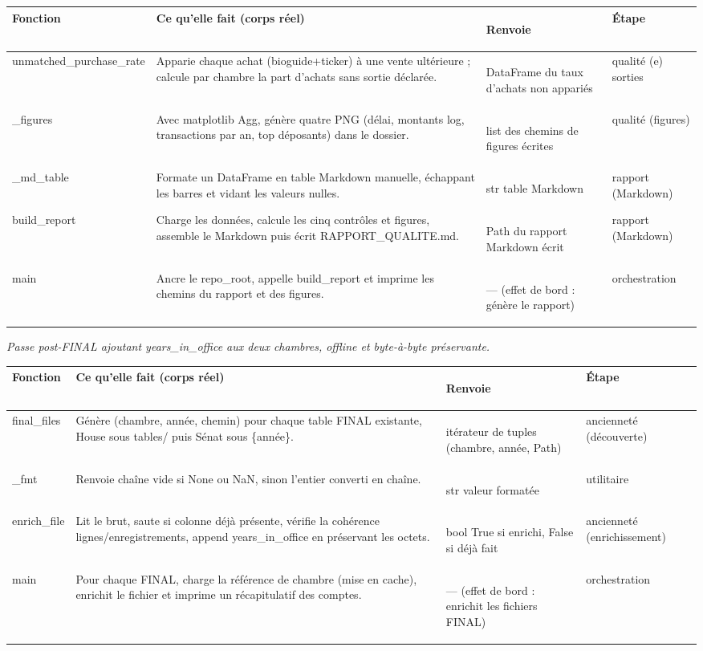 \documentclass[11pt,a4paper]{article}
\makeatletter
\newenvironment{fnt}{%
  \par\footnotesize
  \setlength{\tabcolsep}{3pt}%
  \begin{longtable}{@{}>{\ttfamily\scriptsize\raggedright\arraybackslash}p{3.0cm} >{\raggedright\arraybackslash}p{7.5cm} >{\itshape\scriptsize\raggedright\arraybackslash}p{2.7cm} >{\scriptsize\raggedright\arraybackslash}p{1.85cm}@{}}
  \toprule
  \normalfont\bfseries\scriptsize Fonction & \bfseries\scriptsize Ce qu'elle fait (corps réel) &
  \normalfont\bfseries\scriptsize Renvoie & \normalfont\bfseries\scriptsize Étape\\
  \midrule\endhead
}{\bottomrule\end{longtable}\par}
\newcommand{\fnmod}[2]{\par\smallskip\noindent{\ttfamily\bfseries #1}\;\textmd{\itshape\small\textemdash{} #2}\par\nobreak\vspace{2pt}}
\makeatother
\begin{document}
\begin{fnt}
unmatched_\allowbreak purchase_\allowbreak rate & Apparie chaque achat (bioguide+ticker)\allowbreak{} à une vente ultérieure ; calcule par chambre la part d'achats sans sortie déclarée. & DataFrame du taux d'achats non appariés & qualité (e) sorties \\
_\allowbreak figures & Avec matplotlib Agg,\allowbreak{} génère quatre PNG (délai,\allowbreak{} montants log,\allowbreak{} transactions par an,\allowbreak{} top déposants)\allowbreak{} dans le dossier. & list des chemins de figures écrites & qualité (figures) \\
_\allowbreak md_\allowbreak table & Formate un DataFrame en table Markdown manuelle,\allowbreak{} échappant les barres et vidant les valeurs nulles. & str table Markdown & rapport (Markdown) \\
build_\allowbreak report & Charge les données,\allowbreak{} calcule les cinq contrôles et figures,\allowbreak{} assemble le Markdown puis écrit RAPPORT_QUALITE.md. & Path du rapport Markdown écrit & rapport (Markdown) \\
main & Ancre le repo_root,\allowbreak{} appelle build_report et imprime les chemins du rapport et des figures. & — (effet de bord : génère le rapport)\allowbreak{} & orchestration \\
\end{fnt}
\fnmod{enrich_tenure.py}{Passe post-FINAL ajoutant years_in_office aux deux chambres, offline et byte-à-byte préservante.}
\begin{fnt}
final_\allowbreak files & Génère (chambre,\allowbreak{} année,\allowbreak{} chemin)\allowbreak{} pour chaque table FINAL existante,\allowbreak{} House sous tables/\allowbreak{} puis Sénat sous \{année\}. & itérateur de tuples (chambre,\allowbreak{} année,\allowbreak{} Path)\allowbreak{} & ancienneté (découverte) \\
_\allowbreak fmt & Renvoie chaîne vide si None ou NaN,\allowbreak{} sinon l'entier converti en chaîne. & str valeur formatée & utilitaire \\
enrich_\allowbreak file & Lit le brut,\allowbreak{} saute si colonne déjà présente,\allowbreak{} vérifie la cohérence lignes/\allowbreak{}enregistrements,\allowbreak{} append years_in_office en préservant les octets. & bool True si enrichi,\allowbreak{} False si déjà fait & ancienneté (enrichissement) \\
main & Pour chaque FINAL,\allowbreak{} charge la référence de chambre (mise en cache)\allowbreak{},\allowbreak{} enrichit le fichier et imprime un récapitulatif des comptes. & — (effet de bord : enrichit les fichiers FINAL)\allowbreak{} & orchestration \\
\end{fnt}
\end{document}

